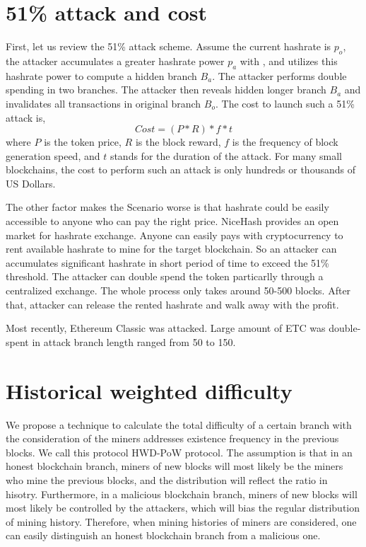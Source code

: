 \documentclass[conference]{IEEEtran}
\begin{document}
\section{51\% attack and cost}
First, let us review the 51\% attack scheme. Assume the current hashrate is $p_o$, the attacker accumulates a greater hashrate power $p_a$ with , and utilizes this hashrate power to compute a hidden branch $B_a$. The attacker performs double spending in two branches. The attacker then reveals hidden longer branch $B_a$ and invalidates all transactions in original branch $B_o$. The cost to launch such a 51\% attack is,
\begin{equation}
Cost=(P*R)*f*t\label{eq_cost}
\end{equation}
where $P$ is the token price, $R$ is the block reward, $f$ is the frequency of block generation speed, and $t$ stands for the duration of the attack.
For many small blockchains, the cost to perform such an attack is only hundreds or thousands of US Dollars\cite{b9}.

The other factor makes the Scenario worse is that hashrate could be easily accessible to anyone who can pay the right price. NiceHash\cite{b10} provides an open market for hashrate exchange. Anyone can easily pays with cryptocurrency to rent available hashrate to mine for the target blockchain. So an attacker can accumulates significant hashrate in short period of time to exceed the 51\% threshold. The attacker can double spend the token particarlly through a centralized exchange. The whole process only takes around 50-500 blocks. After that, attacker can release the rented hashrate and walk away with the profit. 

Most recently, Ethereum Classic\cite{b11} was attacked. Large amount of ETC was double-spent in attack branch length ranged from 50 to 150.

\section{Historical weighted difficulty}

We propose a technique to calculate the total difficulty of a certain branch with the consideration of the miners addresses existence frequency in the previous blocks. We call this protocol HWD-PoW protocol. The assumption is that in an honest blockchain branch, miners of new blocks will most likely be the miners who mine the previous blocks, and the distribution will reflect the ratio in hisotry. Furthermore, in a malicious blockchain branch, miners of new blocks will most likely be controlled by the attackers, which will bias the regular distribution of mining history. Therefore, when mining histories of miners are considered, one can easily distinguish an honest blockchain branch from a malicious one.
\end{document}
